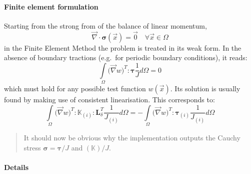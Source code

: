 \documentclass{goose-article}
\newcommand\T[1]{\bm{{#1}}}
\newcommand\TT[1]{\mathbb{{#1}}}
\begin{document}
\paragraph{Finite element formulation}

Starting from the strong from of the balance of linear momentum,
\begin{equation}
    \vec{\nabla} \cdot \T{\sigma}(\vec{x}) = \vec{0} \quad \forall \vec{x} \in \Omega
\end{equation}
in the Finite Element Method the problem is treated in its weak form.
In the absence of boundary tractions (e.g.\ for periodic boundary conditions), it reads:
\begin{equation}
    \int\limits_{\Omega} \big( \vec{\nabla} w )^T : \T{\tau} \frac{1}{J} d\Omega = 0
\end{equation}
which must hold for any possible test function $w(\vec{x})$.
Its solution is usually found by making use of consistent linearisation.
This corresponds to:
\begin{equation}
    \int\limits_{\Omega} \big( \vec{\nabla} w )^T
    : \TT{K}_{(i)}
    : \T{L}_\delta^T \frac{1}{J_{(i)}} d\Omega
    =
    - \int\limits_{\Omega} \big( \vec{\nabla} w )^T
    : \T{\tau}_{(i)} \frac{1}{J_{(i)}} d\Omega
\end{equation}


\begin{framed}
\begin{quote}
  It should now be obvious why the implementation outputs the Cauchy stress
  $\T{\sigma} = \T{\tau} / J$ and $(\TT{K}) / J$.
\end{quote}
\end{framed}

\paragraph{Details}
\end{document}
